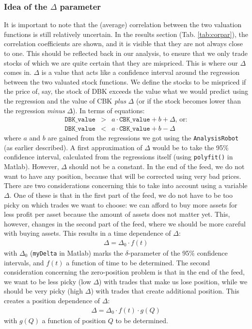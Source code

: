 \documentclass[a4paper]{article}
\begin{document}
\subsubsection{Idea of the $\Delta$ parameter}
It is important to note that the (average) correlation between the two valuation functions is still relatively uncertain. In the results section (Tab. \ref{tab:corpar}), the correlation coefficients are shown, and it is visible that they are not always close to one. This should be reflected back in our analysis, to ensure that we only trade stocks of which we are quite certain that they are mispriced. This is where our $\Delta$ comes in. $\Delta$ is a value that acts like a confidence interval around the regression between the two valuated stock functions. We define the stocks to be mispriced if the price of, say, the stock of DBK exceeds the value what we would predict using the regression and the value of CBK \textit{plus} $\Delta$ (or if the stock becomes lower than the regression \textit{minus} $\Delta$). In terms of equations:
\begin{eqnarray*}
\texttt{DBK\_value}&>&a\cdot \texttt{CBK\_value}+b+\Delta\text{, or:}\\
\texttt{DBK\_value}&<&a\cdot \texttt{CBK\_value}+b-\Delta
\end{eqnarray*}
where $a$ and $b$ are gained from the regressions we got using the \texttt{AnalysisRobot} (as earlier described). A first approximation of $\Delta$ would be to take the 95\% confidence interval, calculated from the regressions itself (using \texttt{polyfit()} in Matlab). However, $\Delta$ should not be a constant. In the end of the feed, we do not want to have any position, because that will be corrected using very bad prices. There are two considerations concerning this to take into account using a variable $\Delta$. One of these is that in the first part of the feed, we do not have to be too picky on which trades we want to choose: we can afford to buy more assets for less profit per asset because the amount of assets does not matter yet. This, however, changes in the second part of the feed, where we should be more careful with buying assets. This results in a time dependence of $\Delta$:
\begin{eqnarray}
\Delta = \Delta_0\cdot f(t)
\end{eqnarray}
with $\Delta_0$ (\texttt{myDelta} in Matlab) marks the $\delta$-parameter of the 95\% confidence intervals, and $f(t)$ a function of time to be determined. The second consideration concerning the zero-position problem is that in the end of the feed, we want to be less picky (low $\Delta$) with trades that make us lose position, while we should be very picky (high $\Delta$) with trades that create additional position. This creates a position dependence of $\Delta$:
\begin{eqnarray}
\Delta = \Delta_0\cdot f(t)\cdot g(Q)
\end{eqnarray}
with $g(Q)$ a function of position $Q$ to be determined.
\end{document}
